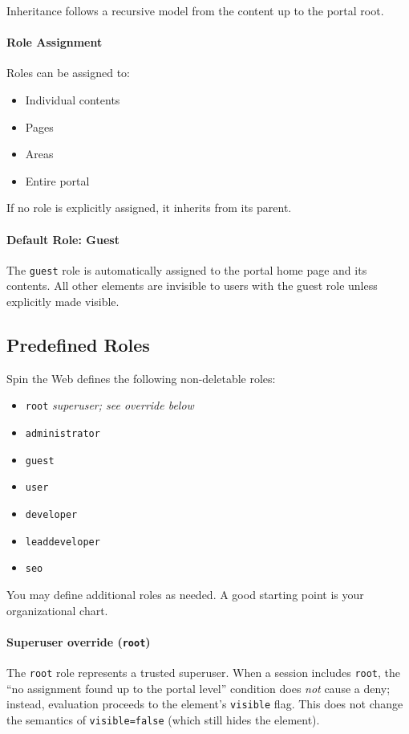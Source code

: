 Inheritance follows a recursive model from the content up to the portal root.

\paragraph{Role Assignment}
Roles can be assigned to:
\begin{itemize}
	\item Individual contents
	\item Pages
	\item Areas
	\item Entire portal
\end{itemize}
If no role is explicitly assigned, it inherits from its parent.

\paragraph{Default Role: Guest}
The \texttt{guest} role is automatically assigned to the portal home page and its contents. All other elements are invisible to users with the guest role unless explicitly made visible.

\subsection{Predefined Roles}

Spin the Web defines the following non-deletable roles:

\begin{itemize}
	\item \texttt{root} \hfill\emph{superuser; see override below}
	\item \texttt{administrator}
	\item \texttt{guest}
	\item \texttt{user}
	\item \texttt{developer}
	\item \texttt{leaddeveloper}
	\item \texttt{seo}
\end{itemize}

You may define additional roles as needed. A good starting point is your organizational chart.

\paragraph{Superuser override (\texttt{root})}
The \texttt{root} role represents a trusted superuser. When a session includes \texttt{root}, the “no assignment found up to the portal level” condition does \emph{not} cause a deny; instead, evaluation proceeds to the element’s \texttt{visible} flag. This does not change the semantics of \texttt{visible=false} (which still hides the element).

